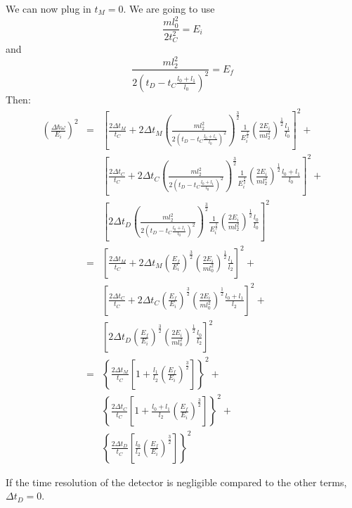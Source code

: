 \documentclass[11pt,oneside,reqno]{amsart}
\begin{document}
We can now plug in $t_M=0$. We are going to use
\begin{equation}
\frac{m l_0^2}{2t_C^2}=E_i
\end{equation}
and 
\begin{equation}
\frac{m l_2^2}{2\left(t_D-t_C\frac{l_0+l_1}{l_0}\right)^2}=E_f
\end{equation}
Then:
\begin{eqnarray}
\left(\frac{\Delta \hbar \omega}{E_i}\right)^2&=& \left[\frac{2\Delta t_M }{t_C}+2\Delta t_M \left(\frac{m l_2^2}{2\left(t_D-t_C\frac{l_0+l_1}{l_0}\right)^2}\right)^\frac{3}{2}\frac{1}{E_i^\frac{3}{2}}\left(\frac{2E_i}{m l_2^2}\right)^\frac{1}{2}\frac{l_1}{l_0}\right]^2+\nonumber\\
&&\left[\frac{2\Delta t_C }{t_C}+2\Delta t_C \left(\frac{m l_2^2}{2\left(t_D-t_C\frac{l_0+l_1}{l_0}\right)^2}\right)^\frac{3}{2}\frac{1}{E_i^\frac{3}{2}}\left(\frac{2E_i}{m l_2^2}\right)^\frac{1}{2}\frac{l_0+l_1}{l_0}\right]^2+\nonumber\\
&&\left[2\Delta t_D \left(\frac{m l_2^2}{2\left(t_D-t_C\frac{l_0+l_1}{l_0}\right)^2}\right)^\frac{3}{2}\frac{1}{E_i^\frac{3}{2}}\left(\frac{2E_i}{m l_2^2}\right)^\frac{1}{2}\frac{l_0}{l_0}\right]^2\\
&=&\left[\frac{2\Delta t_M }{t_C}+2\Delta t_M\left(\frac{E_f}{E_i}\right)^\frac{3}{2}\left(\frac{2E_i}{m l_0^2}\right)^\frac{1}{2}\frac{l_1}{l_2}\right]^2+\nonumber\\
&&\left[\frac{2\Delta t_C}{t_C}+2\Delta t_C\left(\frac{E_f}{E_i}\right)^\frac{3}{2}\left(\frac{2E_i}{m l_0^2}\right)^\frac{1}{2}\frac{l_0+l_1}{l_2}\right]^2+\nonumber\\
&&\left[2\Delta t_D\left(\frac{E_f}{E_i}\right)^\frac{3}{2}\left(\frac{2E_i}{m l_0^2}\right)^\frac{1}{2}\frac{l_0}{l_2}\right]^2\\
&=&\left\lbrace\frac{2\Delta t_M }{t_C}\left[1+\frac{l_1}{l_2}\left(\frac{E_f}{E_i}\right)^\frac{3}{2}\right]\right\rbrace^2+\nonumber\\
&&\left\lbrace\frac{2\Delta t_C }{t_C}\left[1+\frac{l_0+l_1}{l_2}\left(\frac{E_f}{E_i}\right)^\frac{3}{2}\right]\right\rbrace^2+\nonumber\\
&&\left\lbrace\frac{2\Delta t_D }{t_C}\left[\frac{l_0}{l_2}\left(\frac{E_f}{E_i}\right)^\frac{3}{2}\right]\right\rbrace^2
\end{eqnarray}

If the time resolution of the detector is negligible compared to the other terms, $\Delta t_D=0$.
\end{document}
